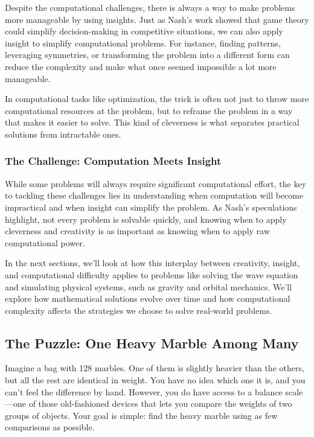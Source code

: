 Despite the computational challenges, there is always a way to make problems more manageable by using insights. Just as Nash’s work showed that game theory could simplify decision-making in competitive situations, we can also apply insight to simplify computational problems. For instance, finding patterns, leveraging symmetries, or transforming the problem into a different form can reduce the complexity and make what once seemed impossible a lot more manageable.

In computational tasks like optimization, the trick is often not just to throw more computational resources at the problem, but to reframe the problem in a way that makes it easier to solve. This kind of cleverness is what separates practical solutions from intractable ones.

\subsubsection{The Challenge: Computation Meets Insight}

While some problems will always require significant computational effort, the key to tackling these challenges lies in understanding when computation will become impractical and when insight can simplify the problem. As Nash’s speculations highlight, not every problem is solvable quickly, and knowing when to apply cleverness and creativity is as important as knowing when to apply raw computational power.

In the next sections, we’ll look at how this interplay between creativity, insight, and computational difficulty applies to problems like solving the wave equation and simulating physical systems, such as gravity and orbital mechanics. We’ll explore how mathematical solutions evolve over time and how computational complexity affects the strategies we choose to solve real-world problems.

\subsection{The Puzzle: One Heavy Marble Among Many}

Imagine a bag with 128 marbles. One of them is slightly heavier than the others, but all the rest are identical in weight. You have no idea which one it is, and you can’t feel the difference by hand. However, you do have access to a balance scale—one of those old-fashioned devices that lets you compare the weights of two groups of objects. Your goal is simple: find the heavy marble using as few comparisons as possible.


